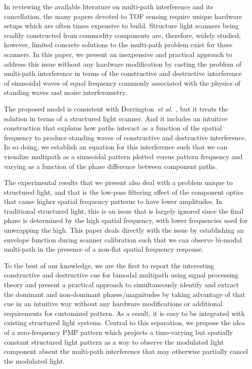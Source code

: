 \documentclass[10pt]{article}
\begin{document}
In reviewing the available literature on multi-path interference and its cancellation, the many papers devoted to TOF sensing require unique hardware setups which are often times expensive to build. Structure light scanners being readily constructed from commodity components are, therefore, widely studied; however, limited concrete solutions to the multi-path problem exist for these scanners.  In this paper, we present an inexpensive and practical approach to address this issue without any hardware modification by casting the problem of multi-path interference in terms of the constructive and destructive interference of sinusoidal waves of equal frequency commonly associated with the physics of standing waves and moire interferometry. 

The proposed model is consistent with Dorrington~{\it et al.}~\cite{dorrington2011separating}, but it treats the solution in terms of a structured light scanner.  And it includes an intuitive construction that explains how paths interact as a function of the spatial frequency to produce standing waves of constructive and destructive interference.   In so doing, we establish an equation for this interference such that we can visualize multipath as a sinusoidal pattern plotted versus pattern frequency and varying as a function of the phase difference between component paths.  

The experimental results that we present also deal with a problem unique to structured light, and that is the low-pass filtering affect of the component optics that cause higher spatial frequency patterns to have lower amplitudes.  In traditional structured light, this is an issue that is largely ignored since the final phase is determined by the high spatial frequency, with lower frequencies used for unwrapping the high.  This paper deals directly with the issue by establishing an envelope function during scanner calibration such that we can observe bi-modal multi-path in the presence of a non-flat spatial frequency response. 

To the best of our knowledge, we are the first to report the interesting constructive and destructive cue for bimodal multipath using signal processing theory and present a practical approach to simultaneously identify and extract the dominant and non-dominant phases/magnitudes by taking advantage of that cue in an intuitive way without any hardware modifications or additional requirements for customized pattern. As a result, it is easy to be integrated with existing structured light systems. Central to this separation, we propose the idea of a zero-frequency PMP pattern which projects a time-varying but spatially constant structured light pattern as a way to observe the modulated light component absent the multi-path interference that may otherwise partially cancel the modulated light. 
\end{document}

